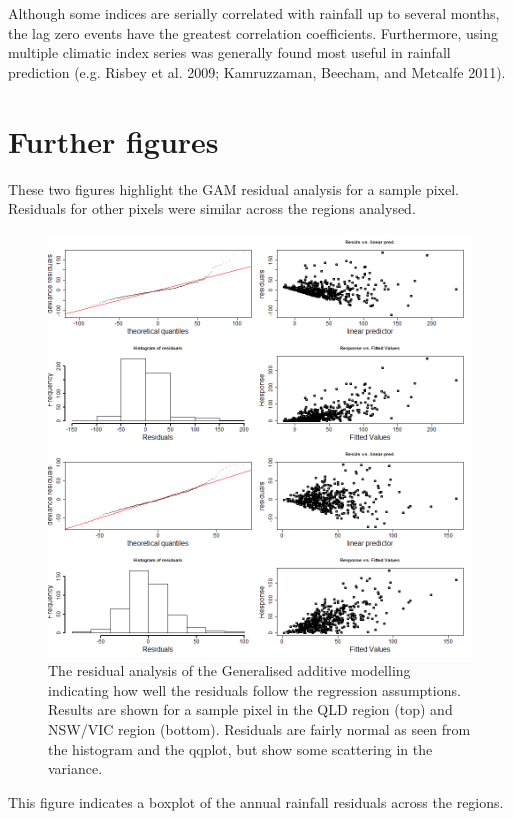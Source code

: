 \documentclass[fleqn,10pt,lineno]{wlpeerj} %
\theoremstyle{definition}
\theoremstyle{definition}
\theoremstyle{definition}
\theoremstyle{remark}
\begin{document}
Although some indices are serially correlated with rainfall up to
several months, the lag zero events have the greatest correlation
coefficients. Furthermore, using multiple climatic index series was
generally found most useful in rainfall prediction (e.g. Risbey et al.
2009; Kamruzzaman, Beecham, and Metcalfe 2011).

\newpage

\section{Further figures}\label{further-figures}

These two figures highlight the GAM residual analysis for a sample
pixel. Residuals for other pixels were similar across the regions
analysed.

\begin{figure}
\includegraphics[width=0.9\linewidth]{figures/FigS3} \caption{The residual analysis of the Generalised additive modelling  indicating how well the residuals follow the regression assumptions. Results are shown for a sample pixel in the QLD region (top) and NSW/VIC region (bottom). Residuals are fairly normal as seen from the histogram and the qqplot, but show some scattering in the variance.}\label{fig:residuals}
\end{figure}

This figure indicates a boxplot of the annual rainfall residuals across
the regions.
\end{document}
